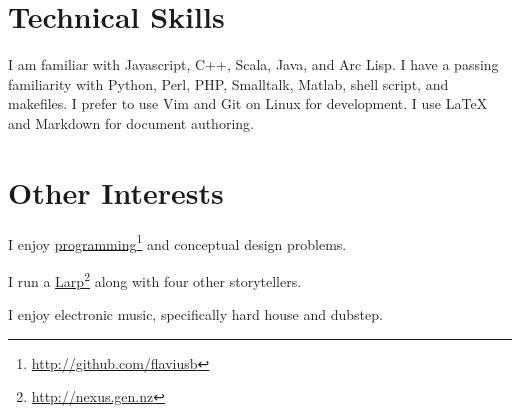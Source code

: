 \documentclass[10pt,oneside]{memoir}
\def\mybibliostyle{plain}
\def\bibliocommand{}
\begin{document}
{}
\section*{Technical Skills}
\label{technicalskills}

I am familiar with Javascript, C++, Scala, Java, and Arc Lisp. I have a passing familiarity with Python, Perl, PHP, Smalltalk, Matlab, shell script, and makefiles. I prefer to use Vim and Git on Linux for development. I use LaTeX and Markdown for document authoring.


{}
\section*{Other Interests}
\label{otherinterests}

I enjoy \href{http://github.com/flaviusb}{programming}\footnote{\href{http://github.com/flaviusb}{http://github.com/flaviusb}} and conceptual design problems.


I run a \href{http://nexus.gen.nz}{Larp}\footnote{\href{http://nexus.gen.nz}{http://nexus.gen.nz}} along with four other storytellers.


I enjoy electronic music, specifically hard house and dubstep.


%
%

\backmatter


\bibliocommand

\printglossary


\printindex
\end{document}
